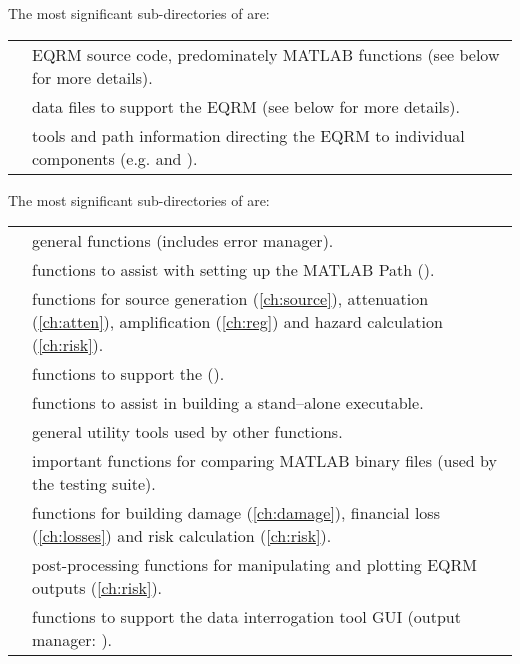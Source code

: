 \vspace{2em} The most significant sub-directories of
 are:

\begin{supertabular}{lp{0.7\textwidth}}
 & EQRM source code, predominately MATLAB functions (see below for more details). \\
 & data files to support the EQRM (see below for more details). \\
 &  tools and path information directing the EQRM to individual components (e.g.  and ). \\
\end{supertabular}

\vspace{2em}

The most significant sub-directories of
 are:

\begin{supertabular}{lp{0.7\textwidth}}
 & general functions (includes error manager). \\
 & functions to assist with setting up the MATLAB Path ().\\
 & functions for source generation
(\cref{ch:source}), attenuation (\cref{ch:atten}),
amplification (\cref{ch:reg}) and hazard calculation (\cref{ch:risk}).\\
 & functions to support the  ().\\
 & functions to assist in building a stand--alone executable.\\
 & general utility tools used by other functions.\\
 & important functions for comparing MATLAB binary files (used by the testing suite).\\
 & functions for building damage
(\cref{ch:damage}), financial loss (\cref{ch:losses}) and
risk calculation (\cref{ch:risk}).\\
 & post-processing functions for manipulating and plotting EQRM outputs (\cref{ch:risk}).\\
 & functions to support the data interrogation tool GUI (output manager: ).\\
\end{supertabular}


